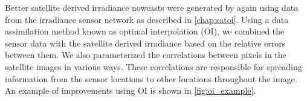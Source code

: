 Better satellite derived irradiance nowcasts were generated by again
using data from the irradiance sensor network as described in
\cref{chap:satoi}.
Using a data assimilation method known as optimal interpolation (OI),
we combined the sensor data with the satellite derived irradiance
based on the relative errors between them.
We also parameterized the correlations between pixels in the satellite
images in various ways.
These correlations are responsible for spreading information from the
sensor locations to other locations throughout the image.
An example of improvements using OI is shown in \cref{fig:oi_example}.


\begin{figure}[htb]
\centering
\captionsetup[subfigure]{labelformat=empty}
\vspace{-1em}\\

\end{figure}
